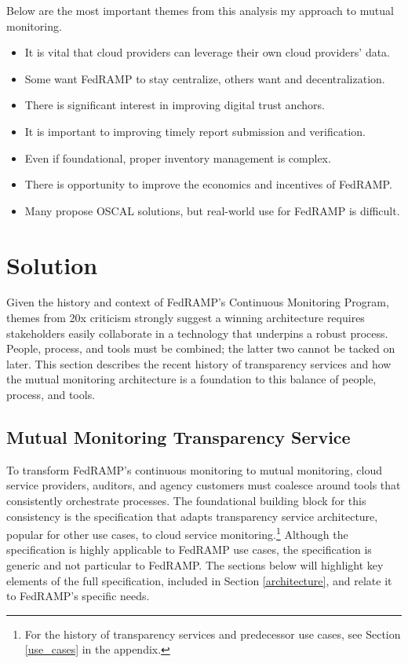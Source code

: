 \documentclass{jdf}
\begin{document}
Below are the most important themes from this analysis my approach to mutual monitoring.

\begin{itemize}
    \item It is vital that cloud providers can leverage their own cloud providers' data.
    \item Some want FedRAMP to stay centralize, others want and decentralization.
    \item There is significant interest in improving digital trust anchors.
    \item It is important to improving timely report submission and verification.
    \item Even if foundational, proper inventory management is complex.
    \item There is opportunity to improve the economics and incentives of FedRAMP.
    \item Many propose OSCAL solutions, but real-world use for FedRAMP is difficult.
\end{itemize}

\section{Solution}

Given the history and context of FedRAMP's Continuous Monitoring Program, themes from 20x criticism strongly suggest a winning architecture requires stakeholders easily collaborate in a technology that underpins a robust process. People, process, and tools must be combined; the latter two cannot be tacked on later. This section describes the recent history of transparency services and how the mutual monitoring architecture is a foundation to this balance of people, process, and tools.

\subsection{Mutual Monitoring Transparency Service}

To transform FedRAMP's continuous monitoring to mutual monitoring, cloud service providers, auditors, and agency customers must coalesce around tools that consistently orchestrate processes. The foundational building block for this consistency is the  specification that adapts transparency service architecture, popular for other use cases, to cloud service monitoring.\footnote{For the history of transparency services and predecessor use cases, see Section \ref{use_cases} in the appendix.} Although the specification is highly applicable to FedRAMP use cases, the specification is generic and not particular to FedRAMP. The sections below will highlight key elements of the full specification, included in Section \ref{architecture}, and relate it to FedRAMP's specific needs.
\end{document}

